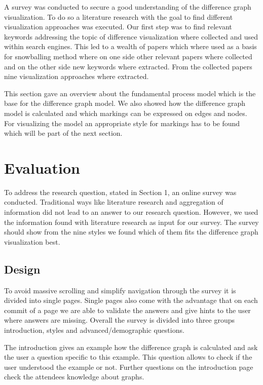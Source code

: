 \documentclass{llncs}
\begin{document}
A survey was conducted to secure a good understanding of the difference graph visualization. To do so a literature research with the goal to find different visualization approaches was executed. Our first step was to find relevant keywords addressing the topic of difference visualization where collected and used within search engines. This led to a wealth of papers which where used as a basis for snowballing method where on one side other relevant papers where collected and on the other side new keywords where extracted. From the collected papers nine visualization approaches where extracted.

This section gave an overview about the fundamental process model which is the base for the difference graph model. We also showed how the difference graph model is calculated and which markings can be expressed on edges and nodes. For visualizing the model an appropriate style for markings has to be found which will be part of the next section.

\section{Evaluation} %
\label{sec:Evaluation} %
To address the research question, stated in Section 1, an online survey was conducted. Traditional ways like literature research and aggregation of information did not lead to an answer to our research question. However, we used the information found with literature research as input for our survey. The survey should show from the nine styles we found which of them fits the difference graph visualization best.


\subsection{Design} %
\label{sec:Design}
To avoid massive scrolling and simplify navigation through the survey it is divided into single pages. Single pages also come with the advantage that on each commit of a page we are able to validate the answers and give hints to the user where answers are missing. Overall the survey is divided into three groups introduction, styles and advanced/demographic questions.

The introduction gives an example how the difference graph is calculated and ask the user a question specific to this example. This question allows to check if the user understood the example or not. Further questions on the introduction page check the attendees knowledge about graphs.
\end{document}

